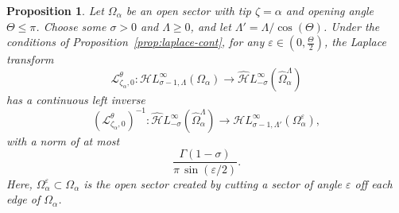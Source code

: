 \documentclass{article}
\newcommand{\singexp}[2]{\mathcal{H}L^\infty_{#1, #2}}
\newcommand{\dualsingexp}[1]{\widehat{\mathcal{H}}L^\infty_{#1}}
\newcommand{\maps}{\colon}
\newcommand{\laplace}{\mathcal{L}}
\theoremstyle{definition}
\theoremstyle{plain}
\newtheorem{prop}[definition]{Proposition}
\begin{document}
\begin{prop}\label{prop:inverse_laplace_analytic}
Let $\Omega_\alpha$ be an open sector with tip $\zeta = \alpha$ and opening angle $\Theta \le \pi$. Choose some $\sigma > 0$ and $\Lambda \ge 0$, and let $\Lambda' = \Lambda / \cos(\Theta)$. Under the conditions of Proposition~\ref{prop:laplace-cont}, for any $\varepsilon \in (0, \tfrac{\Theta}{2})$, the Laplace transform
\[ \laplace_{\zeta_\alpha, 0}^\theta \maps \singexp{\sigma-1}{\Lambda}(\Omega_\alpha) \to \dualsingexp{-\sigma}(\widehat{\Omega}_\alpha^\Lambda) \]
has a continuous left inverse
\[ \left(\laplace_{\zeta_\alpha, 0}^\theta\right)^{-1} \maps \dualsingexp{-\sigma}(\widehat{\Omega}_\alpha^\Lambda) \to \singexp{\sigma-1}{\Lambda'}(\Omega_\alpha^\varepsilon), \]
with a norm of at most
\[ \frac{\Gamma(1-\sigma)}{\pi\,\sin(\varepsilon/2)}. \]
Here, $\Omega_\alpha^\varepsilon \subset \Omega_\alpha$ is the open sector created by cutting a sector of angle $\varepsilon$ off each edge of $\Omega_\alpha$.
\end{prop}
\end{document}
